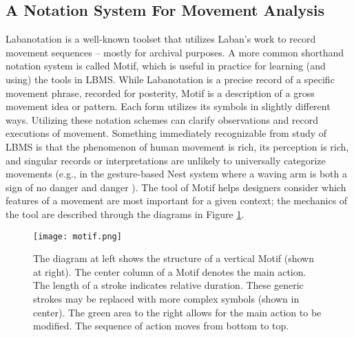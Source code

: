 \documentclass[arts,article,submit,moreauthors,pdftex,10pt,a4paper]{mdpi}
\begin{document}
\subsection{A Notation System For Movement Analysis}
Labanotation is a well-known toolset that utilizes Laban's work to record movement sequences -- mostly for archival purposes.  A more common shorthand notation system is called Motif, which is useful in practice for learning (and using) the tools in LBMS.
While Labanotation is a precise record of a specific movement phrase, recorded for posterity, Motif is a description of a gross movement idea or pattern. Each form utilizes its symbols in slightly different ways. Utilizing these notation schemes can clarify observations and record executions of movement. Something immediately recognizable from study of LBMS is that the phenomenon of human movement is rich, its perception is rich, and singular records or interpretations are unlikely to universally categorize movements (e.g., in the gesture-based Nest system where a waving arm is both a sign of no danger and danger \cite{nest}). The tool of Motif helps designers consider which features of a movement are most important for a given context; the mechanics of the tool are described through the diagrams in Figure \ref{motif}.

\begin{figure}[h!]
\centering
\vspace{-.1in}
\texttt{[image: motif.png]}
\caption{The diagram at left shows the structure of a vertical Motif (shown at right).  The center column of a Motif denotes the main action. The length of a stroke indicates relative duration. These generic strokes may be replaced with more complex symbols (shown in center). The green area to the right allows for the main action to be modified. The sequence of action moves from bottom to top. }
\label{motif}
\end{figure}
\end{document}
